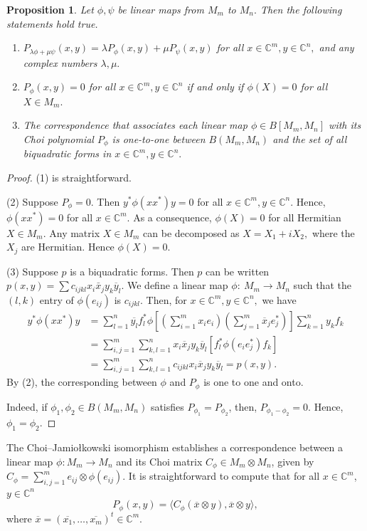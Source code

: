 \documentclass[12pt,a4paper]{amsart}
\theoremstyle{plain}
\newtheorem{proposition}[theorem]{Proposition}
\theoremstyle{remark}
\theoremstyle{definition}
\def \C {\mathbb{C}}
\begin{document}
\begin{proposition}\label{11coresp}
	Let $\phi, \psi$ be linear maps from $M_m$ to $M_n.$ Then the following statements hold true.
	\begin{enumerate}
		\item $P_{\lambda \phi + \mu \psi}(x,y) = \lambda P_{\phi}(x,y) + \mu P_{\psi}(x,y)$ for all $x\in \C^m, y \in \C^n,$ and any complex numbers $\lambda, \mu.$
		\item $P_{\phi}(x,y)=0$ for all $x\in \C^m, y \in \C^n$ if and only if $\phi(X) = 0$ for all $X\in M_m.$
		\item The correspondence that associates each linear map $\phi \in B[M_m, M_n]$  with its Choi polynomial $P_{\phi}$ is one-to-one between $B(M_m,M_n)$ and the set of all biquadratic forms in $x\in \C^m, y\in \C^n.$ 
	\end{enumerate}
\end{proposition}
\begin{proof}
	(1) is straightforward.
	
	(2) Suppose $P_{\phi} =0.$ Then $y^*\phi(xx^*)y=0$ for all $x\in \C^m, y \in \C^n.$ Hence, $\phi(xx^*) =0$ for all $x\in \C^m.$ As a consequence, $\phi(X) =0$ for all Hermitian $X\in M_m.$ Any matrix $X\in M_m$ can be decomposed as $X = X_1+ iX_2,$ where the $X_j$ are Hermitian. Hence $\phi (X) =0.$   
	
	(3) Suppose $p$ is a biquadratic forms. Then $p$ can be written 
	$p(x,y) = \sum c_{ijkl} x_i\bar{x}_j y_k \overline{y}_l.$ We define a linear map $\phi:\ M_m\to M_n $ such that the $(l,k)$ entry of $\phi(e_{ij})$ is $c_{ijkl}.$   
	Then, for $x\in \C^m, y\in \C^{n},$ we have
	\begin{align*}
		y^*\phi(xx^*)y & = \sum_{l=1}^n\overline{y_l}f_l^* \phi[(\sum_{i=1}^m x_i e_i)(\sum_{j=1}^m \overline{x}_j e^*_j)] \sum_{k=1}^n y_kf_k \\
		& = \sum_{i,j=1}^m\sum_{k,l=1}^n  x_i\overline{x}_j y_k \overline{y}_l [f_l^* \phi(e_i e_j^*) f_k]\\
		& = \sum_{i,j=1}^m\sum_{k,l=1}^n  c_{ijkl} x_i\overline{x}_j y_k \overline{y}_l = p(x,y).
	\end{align*}
	By (2), the corresponding between $\phi$ and $P_{\phi}$ is one to one and onto.
	
	Indeed, if $\phi_1, \phi_2 \in B(M_m, M_n)$ satisfies $P_{\phi_1} = P_{\phi_2}$, then, $P_{\phi_1-\phi_2} = 0$. Hence, $\phi_1 = \phi_2$.
\end{proof}


The Choi–Jamiołkowski isomorphism establishes a correspondence between a linear map $\phi: M_m \to M_n$ and its Choi matrix $C_{\phi} \in M_m\otimes M_n$, given by $C_\phi = \sum_{i,j=1}^m e_{ij} \otimes \phi(e_{ij})$.
It is straightforward to compute that for all $x \in \C^m$,$y \in \C^n$ 
$$ 
P_{\phi}(x,y) = \langle C_\phi(\overline{x} \otimes y), \overline{x} \otimes y\rangle,
$$
where $\overline{x} = (\overline{x_1}, \dots, \overline{x_m})^t \in \C^m$.
\end{document}
